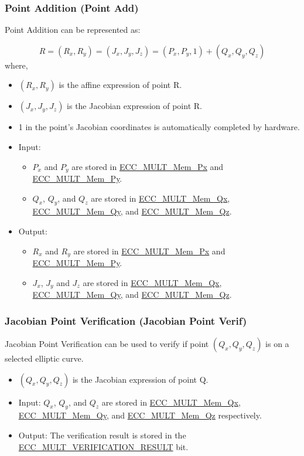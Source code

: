 \documentclass[main\_\_EN.tex]{subfiles}
\begin{document}
\subsubsection{Point Addition (Point Add)}

Point Addition can be represented as:

\[
R = (R_x,R_y) = (J_x,J_y,J_z) = (P_x,P_y,1) + (Q_x,Q_y,Q_z)
\]
where,
\begin{itemize}
    \item $(R_x,R_y)$ is the affine expression of point R.
    \item $(J_x,J_y,J_z)$ is the Jacobian expression of point R.
    \item 1 in the point's Jacobian coordinates is automatically completed by hardware.
    \item Input:
    \begin{itemize}
        \item $P_x$ and $P_y$ are stored in \hyperref[tab:ecc-memory]{ECC\_MULT\_Mem\_Px} and \hyperref[tab:ecc-memory]{ECC\_MULT\_Mem\_Py}.
        \item $Q_x$, $Q_y$, and $Q_z$ are stored in \hyperref[tab:ecc-memory]{ECC\_MULT\_Mem\_Qx}, \hyperref[tab:ecc-memory]{ECC\_MULT\_Mem\_Qy}, and \hyperref[tab:ecc-memory]{ECC\_MULT\_Mem\_Qz}.
    \end{itemize}
    \item Output:
    \begin{itemize}
        \item $R_x$ and $R_y$ are stored in \hyperref[tab:ecc-memory]{ECC\_MULT\_Mem\_Px} and \hyperref[tab:ecc-memory]{ECC\_MULT\_Mem\_Py}.
        \item $J_x$, $J_y$ and $J_z$ are stored in \hyperref[tab:ecc-memory]{ECC\_MULT\_Mem\_Qx}, \hyperref[tab:ecc-memory]{ECC\_MULT\_Mem\_Qy}, and \hyperref[tab:ecc-memory]{ECC\_MULT\_Mem\_Qz}.
    \end{itemize}
\end{itemize}

\subsubsection{Jacobian Point Verification (Jacobian Point Verif)}

Jacobian Point Verification can be used to verify if point $(Q_x,Q_y,Q_z)$ is on a selected elliptic curve.
\begin{itemize}
    \item $(Q_x,Q_y,Q_z)$ is the Jacobian expression of point Q.
    \item Input: $Q_x$, $Q_y$, and $Q_z$ are stored in \hyperref[tab:ecc-memory]{ECC\_MULT\_Mem\_Qx}, \hyperref[tab:ecc-memory]{ECC\_MULT\_Mem\_Qy}, and \hyperref[tab:ecc-memory]{ECC\_MULT\_Mem\_Qz} respectively.
    \item Output: The verification result is stored in the \hyperref[fielddesc:ECCMULTVERIFICATIONRESULT]{ECC\_MULT\_VERIFICATION\_RESULT} bit.
\end{itemize}
\end{document}
